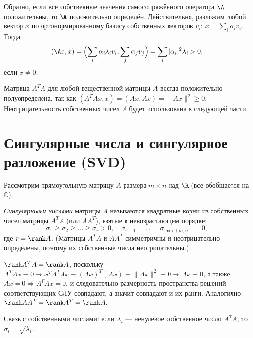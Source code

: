 \documentclass[10pt]{article}
\begin{document}
\begin{corollary}
    Обратно, если все собственные значения самосопряжённого оператора $\A$ положительны, то $\A$ положительно определён. Действительно, разложим любой вектор $x$ по ортонормированному базису собственных векторов $v_i$: $x = \sum_i \alpha_i v_i$. Тогда
    \[
    (\A x, x) = \Bigl(\sum_i \alpha_i \lambda_i v_i, \sum_j \alpha_j v_j\Bigr) = \sum_i |\alpha_i|^2 \lambda_i > 0,
    \]
    если $x \neq 0$.
\end{corollary}

\begin{example}
    Матрица $A^T A$ для любой вещественной матрицы $A$ всегда положительно полуопределена, так как $(A^T A x, x) = (A x, A x) = \|A x\|^2 \ge 0$. Неотрицательность собственных чисел $A$ будет использована в следующей части.
\end{example}

\section{Сингулярные числа и сингулярное разложение (SVD)}

Рассмотрим прямоугольную матрицу $A$ размера $m\times n$ над $\R$ (все обобщается на $\mathbb{C}$).

\begin{definition}
    \textit{Сингулярными числами} матрицы $A$ называются квадратные корни из собственных чисел матрицы $A^T A$ (или $AA^T$), взятые в невозрастающем порядке:
    \[
    \sigma_1 \ge \sigma_2 \ge \dots \ge \sigma_r > 0, \quad \sigma_{r+1}=\dots=\sigma_{\min(m,n)}=0,
    \]
    где $r = \rank A$. (Матрицы $A^T A$ и $AA^T$ симметричны и неотрицательно определены, поэтому их собственные числа неотрицательны.).
\end{definition}

\begin{remark}
    $\rank A^T A = \rank A$, поскольку $A^T A x = 0 \Rightarrow x^T A^T A x = (Ax)^T (Ax) = \|Ax\|^2 = 0 \Rightarrow Ax = 0$, а также $Ax = 0 \Rightarrow A^T A x = 0$, и следовательно размерность пространства решений соответствующих СЛУ совпадают, а значит совпадают и их ранги. Аналогично $\rank A A^T = \rank A^T = \rank A$.
\end{remark}

Связь с собственными числами: если $\lambda_i$ --- ненулевое собственное число $A^T A$, то $\sigma_i = \sqrt{\lambda_i}$.
\end{document}
